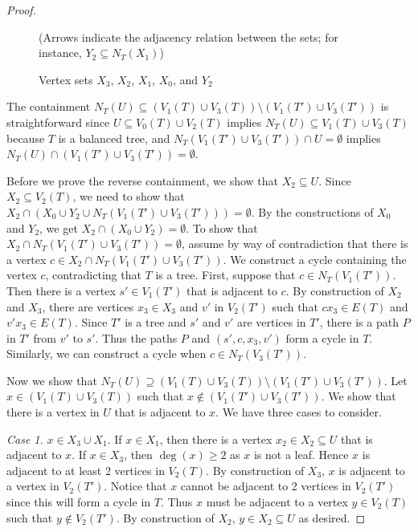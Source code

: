 \documentclass[10pt,a4paper]{amsart}
\begin{document}
\begin{proof}
\begin{figure}[ht]
    \caption{Vertex sets $X_3$, $X_2$, $X_1$, $X_0$, and $Y_2$}
    \label{fig. support adj to V2 1}
    (Arrows indicate the adjacency relation between the sets; for instance, $Y_2 \subseteq N_T(X_1)$)
    \end{figure}
    
    The containment $N_T(U) \subseteq (V_1(T) \cup V_3(T)) \setminus (V_1(T') \cup V_3(T'))$ is straightforward since $U \subseteq V_0(T) \cup V_2(T)$ implies $N_T(U) \subseteq V_1(T) \cup V_3(T)$ because $T$ is a balanced tree, and $N_T(V_1(T') \cup V_3(T')) \cap U = \emptyset$ implies $N_T(U) \cap (V_1(T') \cup V_3(T')) = \emptyset$.

    Before we prove the reverse containment, we show that $X_2 \subseteq U$.
    Since $X_2 \subseteq V_2(T)$, we need to show that $X_2 \cap (X_0 \cup Y_2 \cup N_T(V_1(T') \cup V_3(T'))) = \emptyset$.
    By the constructions of $X_0$ and $Y_2$, we get $X_2 \cap (X_0 \cup Y_2) = \emptyset$.
    To show that $X_2 \cap N_T(V_1(T') \cup V_3(T')) = \emptyset$, assume by way of contradiction that there is a vertex $c \in X_2 \cap N_T(V_1(T') \cup V_3(T'))$.
    We construct a cycle containing the vertex $c$, contradicting that $T$ is a tree.
    First, suppose that $c \in N_T(V_1(T'))$.
    Then there is a vertex $s' \in V_1(T')$ that is adjacent to $c$.
    By construction of $X_2$ and $X_3$, there are vertices $x_3 \in X_3$ and $v'$ in $V_2(T')$ such that $cx_3 \in E(T)$ and $v'x_3 \in E(T)$.
    Since $T'$ is a tree and $s'$ and $v'$ are vertices in $T'$, there is a path $P$ in $T'$ from $v'$ to $s'$.
    Thus the paths $P$ and $(s',c,x_3,v')$ form a cycle in $T$.
    Similarly, we can construct a cycle when $c \in N_T(V_3(T'))$.

    Now we show that $N_T(U) \supseteq (V_1(T) \cup V_3(T)) \setminus (V_1(T') \cup V_3(T'))$.
    Let $x \in (V_1(T) \cup V_3(T))$ such that $x \not\in (V_1(T') \cup V_3(T'))$.
    We show that there is a vertex in $U$ that is adjacent to $x$.
    We have three cases to consider.

    \emph{Case 1.} $x \in X_3 \cup X_1$.
    If $x \in X_1$, then there is a vertex $x_2 \in X_2 \subseteq U$ that is adjacent to $x$.
    If $x \in X_3$, then $\deg(x) \geq 2$ as $x$ is not a leaf.
    Hence $x$ is adjacent to at least 2 vertices in $V_2(T)$.
    By construction of $X_3$, $x$ is adjacent to a vertex in $V_2(T')$.
    Notice that $x$ cannot be adjacent to 2 vertices in $V_2(T')$ since this will form a cycle in $T$.
    Thus $x$ must be adjacent to a vertex $y \in V_2(T)$ such that $y \not\in V_2(T')$.
    By construction of $X_2$, $y \in X_2 \subseteq U$ as desired.


\end{proof}
\end{document}
